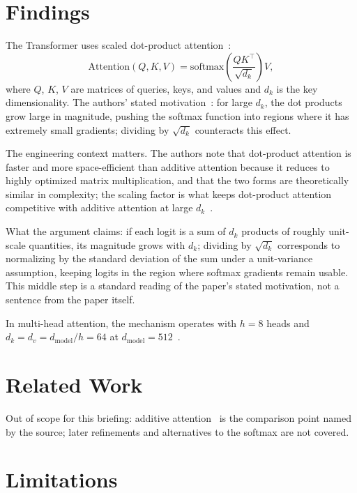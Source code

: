 \documentclass{article}
\begin{document}
\section{Findings}

The Transformer uses scaled dot-product attention~\citep{vaswani2017attention}:
\begin{equation}
\mathrm{Attention}(Q, K, V) = \mathrm{softmax}\!\left(\frac{QK^\top}{\sqrt{d_k}}\right) V ,
\end{equation}
where $Q$, $K$, $V$ are matrices of queries, keys, and values and $d_k$ is the
key dimensionality. The authors' stated motivation~\citep{vaswani2017attention}:
for large $d_k$, the dot products grow large in magnitude, pushing the
softmax function into regions where it has extremely small gradients;
dividing by $\sqrt{d_k}$ counteracts this effect.

The engineering context matters. The authors note that dot-product attention
is faster and more space-efficient than additive attention because it reduces
to highly optimized matrix multiplication, and that the two forms are
theoretically similar in complexity; the scaling factor is what keeps
dot-product attention competitive with additive attention at large
$d_k$~\citep{vaswani2017attention}.

What the argument claims: if each logit is a sum of $d_k$ products of roughly
unit-scale quantities, its magnitude grows with $d_k$; dividing by
$\sqrt{d_k}$ corresponds to normalizing by the standard deviation of the sum
under a unit-variance assumption, keeping logits in the region where softmax
gradients remain usable. This middle step is a standard reading of the
paper's stated motivation, not a sentence from the paper itself.

In multi-head attention, the mechanism operates with $h = 8$ heads and
$d_k = d_v = d_{\mathrm{model}} / h = 64$ at $d_{\mathrm{model}} =
512$~\citep{vaswani2017attention}.

\section{Related Work}

Out of scope for this briefing: additive attention~\citep{vaswani2017attention}
is the comparison point named by the source; later refinements and
alternatives to the softmax are not covered.

\section{Limitations}
\end{document}
